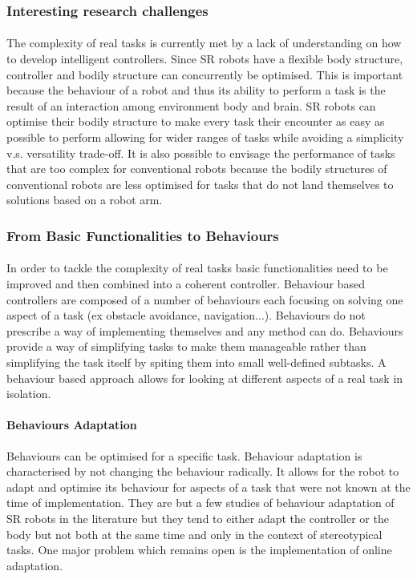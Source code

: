 \subsubsection{Interesting research challenges}
\paragraph{}The complexity of real tasks is currently met by a lack of understanding on how to develop intelligent controllers. Since SR robots have a flexible body structure, controller and bodily structure can concurrently be optimised. This is important because the behaviour of a robot and thus its ability to perform a task is the result of an interaction  among environment body and brain. SR robots can optimise their bodily structure to make every task their encounter as easy as possible to perform allowing for wider ranges of tasks while avoiding a simplicity v.s. versatility trade-off. It is also possible to envisage the performance of tasks that are too complex for conventional robots because the bodily structures of conventional robots are less optimised for tasks that do not land themselves to solutions based on a robot arm.
\subsubsection{From Basic Functionalities to Behaviours}
\paragraph{}In order to tackle the complexity of real tasks basic functionalities need to be improved and then combined into a coherent controller. Behaviour based controllers are composed of a number of behaviours each focusing on solving one aspect of a task (ex obstacle avoidance, navigation...). Behaviours do not prescribe a way of implementing themselves and any method can do. Behaviours provide a way of simplifying tasks to make them manageable rather than simplifying the task itself by spiting them into small well-defined subtasks. A behaviour based approach allows for looking at different aspects of a real task in isolation.
\paragraph{Behaviours Adaptation}Behaviours can be optimised for a specific task. Behaviour adaptation is characterised by not changing the behaviour radically. It allows for the robot to adapt and optimise its behaviour for aspects of a task that were not known at the time of implementation. They are but a few studies of behaviour adaptation of SR robots in the literature but they tend to either adapt the controller or the body but not both at the same time and only in the context of stereotypical tasks. One major problem which remains open is the implementation of online adaptation.
